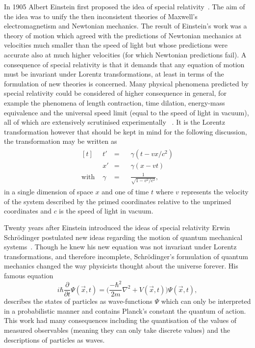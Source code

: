 In 1905 Albert Einstein first proposed the idea of special
relativity~\cite{Einstein:special}. The aim of the idea was to unify the then
inconsistent theories of Maxwell's electromagnetism and Newtonian mechanics. The
result of Einstein's work was a theory of motion which agreed with the
predictions of Newtonian mechanics at velocities much smaller than the speed of
light but whose predictions were accurate also at much higher velocities (for
which Newtonian predictions fail). A consequence of special relativity is that
it demands that any equation of motion must be invariant under Lorentz
transformations, at least in terms of the formulation of new theories is
concerned. Many physical phenomena predicted by special relativity could be
considered of higher consequence in general, for example the phenomena of length
contraction, time dilation, energy-mass equivalence and the universal speed
limit (equal to the speed of light in vacuum), all of which are extensively
scrutinised experimentally ~\cite{sr-tests-1, sr-tests-2, sr-tests-3,
sr-tests-4, sr-tests-5, sr-tests-6, sr-tests-7}. It is the Lorentz
transformation however that should be kept in mind for the following discussion,
the transformation may be written as
\begin{equation}
  \begin{split}
    \begin{aligned}[t] &t'&=&\;\;\;\gamma(t -vx/c^{2})\\ &x'&=&\;\;\;\gamma(x -
vt)\\ \text{with } &\gamma&=&\;\;\;\frac{1}{\sqrt{1 - v^{2}/c^{2}}},
    \end{aligned}
  \end{split}
  \label{eq:lorentz-transform}
\end{equation} in a single dimension of space $x$ and one of time $t$ where $v$
represents the velocity of the system described by the primed coordinates
relative to the unprimed coordinates and $c$ is the speed of light in vacuum.

Twenty years after Einstein introduced the ideas of special relativity Erwin
Schr\"odinger postulated new ideas regarding the motion of quantum mechanical
systems~\cite{Schrodinger}. Though he knew his new equation was not invariant
under Lorentz transformations, and therefore incomplete, Schr\"odinger's
formulation of quantum mechanics changed the way physicists thought about the
universe forever. His famous equation
\begin{equation}
  \label{eq:schrodinger} i\hbar\frac{\partial}{\partial t}\Psi(\vec{x}, t) =
\Bigg(\frac{-\hbar^{2}}{2m}\nabla^{2} + V(\vec{x}, t) \Bigg)\Psi(\vec{x}, t),
\end{equation} describes the states of particles as wave-functions $\Psi$ which
can only be interpreted in a probabilistic manner and contains Planck's constant
the quantum of action. This work had many consequences including the
quantisation of the values of measured observables (meaning they can only take
discrete values) and the descriptions of particles as waves.

